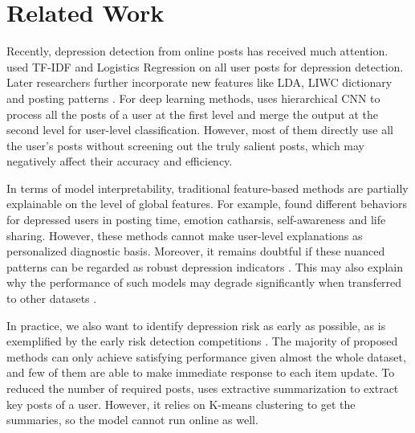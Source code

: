 \section{Related Work}
Recently, depression detection from online posts has received much attention. \citet{losada2016test} used TF-IDF and Logistics Regression on all user posts for depression detection. Later researchers further incorporate new features like LDA, LIWC dictionary and posting patterns \citep{trotzek2018utilizing, harrigian2020models}. For deep learning methods, \citet{yates2017depression} uses hierarchical CNN to process all the posts of a user at the first level and merge the output at the second level for user-level classification. However, most of them directly use all the user's posts without screening out the truly salient posts, which may negatively affect their accuracy and efficiency.

In terms of model interpretability, traditional feature-based methods are partially explainable on the level of global features. For example, \citet{shen2017depression} found different behaviors for depressed users in posting time, emotion catharsis, self-awareness and life sharing. However, these methods cannot make user-level explanations as personalized diagnostic basis. Moreover, it remains doubtful if these nuanced patterns can be regarded as robust depression indicators \citep{ernala2019methodological}. This may also explain why the performance of such models may degrade significantly when transferred to other datasets \citep{harrigian2020models}.

In practice, we also want to identify depression risk as early as possible, as is exemplified by the early risk detection competitions \citep{losada2019overview}. The majority of proposed methods can only achieve satisfying performance given almost the whole dataset, and few of them are able to make immediate response to each item update. To reduced the number of required posts, \citet{zogan2021depressionnet} uses extractive summarization to extract key posts of a user. However, it relies on K-means clustering to get the summaries, so the model cannot run online as well. 

